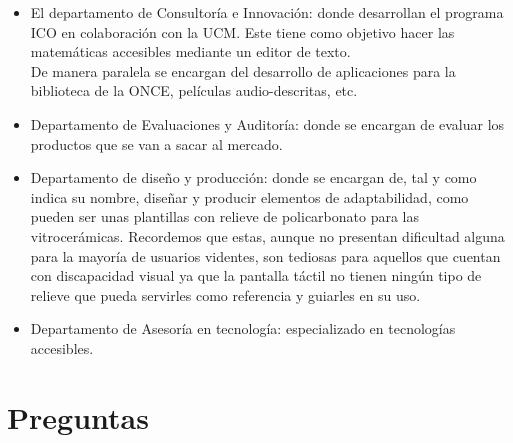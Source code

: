 \documentclass{article}
\begin{document}
	\begin{itemize}
		\item El departamento de Consultoría e Innovación: donde desarrollan el programa ICO en colaboración con la UCM. Este tiene como objetivo hacer las matemáticas accesibles mediante un editor de texto. 
		\\
		De manera paralela se encargan del desarrollo de aplicaciones para la biblioteca de la ONCE, películas audio-descritas, etc.
		\item Departamento de Evaluaciones y Auditoría: donde se encargan de evaluar los productos que se van a sacar al mercado.
		\item Departamento de diseño y producción: donde se encargan de, tal y como indica su nombre, diseñar y producir elementos de adaptabilidad, como pueden ser unas plantillas con relieve de policarbonato para las vitrocerámicas. Recordemos que estas, aunque no presentan dificultad alguna para la mayoría de usuarios videntes, son tediosas para aquellos que cuentan con discapacidad visual ya que la pantalla táctil no tienen ningún tipo de relieve que pueda servirles como referencia y guiarles en su uso.
		\item Departamento de Asesoría en tecnología: especializado en tecnologías accesibles.
	\end{itemize}
	
	
	\section{Preguntas}
	
\end{document}
